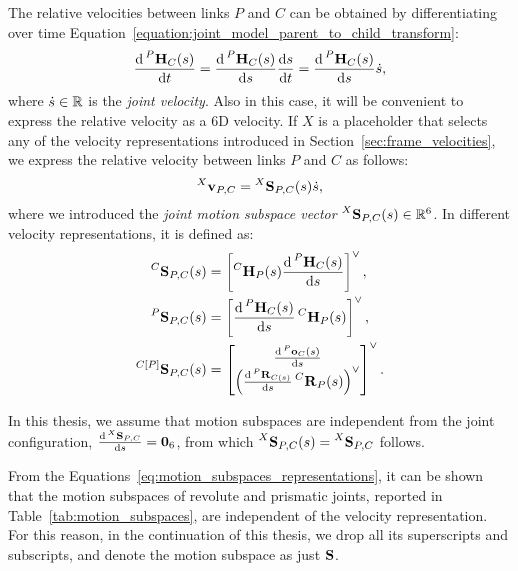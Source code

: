 The relative velocities between links $P$ and $C$ can be obtained by differentiating over time Equation~\ref{equation:joint_model_parent_to_child_transform}:
%
\begin{equation*}
    \dv{\homo[P]_C(\shape)}{t} = \dv{\homo[P]_C(\shape)}{\shape} \dv{\shape}{t} = \dv{\homo[P]_C(\shape)}{\shape} \dot{\shape}
    ,
\end{equation*}
%
where $\dot{\shape} \in \realn$ is the \emph{joint velocity}.
Also in this case, it will be convenient to express the relative velocity as a 6D velocity.
If $X$ is a placeholder that selects any of the velocity representations introduced in Section~\ref{sec:frame_velocities}, we express the relative velocity between links $P$ and $C$ as follows:
%
\begin{equation}
    \label{eq:joint_model_velocity_propagation}
    \velsix[X]_{P,C} = \subspacee[X]_{P,C}(\shape) \dot{\shape}
    ,
\end{equation}
%
where we introduced the \emph{joint motion subspace vector} $\subspacee[X]_{P,C}(\shape) \in \realn^6$.
In different velocity representations, it is defined as:
%
\begin{equation}
    \label{eq:motion_subspaces_representations}
    \begin{aligned}
    \subspacee[C]_{P,C}(\shape) &= \left[ \homo[C]_P(\shape) \dv{\homo[P]_C(\shape)}{\shape} \right]^\vee ,\\
    \subspacee[P]_{P,C}(\shape) &= \left[ \dv{\homo[P]_C(\shape)}{\shape} \homo[C]_P(\shape) \right]^\vee ,\\
    \subspacee[{C[P]}]_{P,C}(\shape) &= \begin{bmatrix}
        \dv{\ori[P]_C(\shape)}{\shape} \\
        \left( \dv{\rot[P]_{C(\shape)}}{\shape} \rot[C]_P(\shape) \right)^\vee
    \end{bmatrix}^\vee
    .
\end{aligned}
\end{equation}

\begin{assumption*}
%
\label{assumption:subspace_independent_configuration}
In this thesis, we assume that motion subspaces are independent from the joint configuration, \ie $\dv{\subspacee[X]_{P,C}}{\shape} = \zeros_6$, from which $\subspacee[X]_{P,C}(\shape) = \subspacee[X]_{P,C}$ follows.
%
\end{assumption*}

\begin{remark}
\label{remark:subspaces_independent_representation}
%
From the Equations~\eqref{eq:motion_subspaces_representations}, it can be shown that the motion subspaces of revolute and prismatic joints, reported in Table~\ref{tab:motion_subspaces}, are independent of the velocity representation.
For this reason, in the continuation of this thesis, we drop all its superscripts and subscripts, and denote the motion subspace as just $\subspace$.
%
\end{remark}

